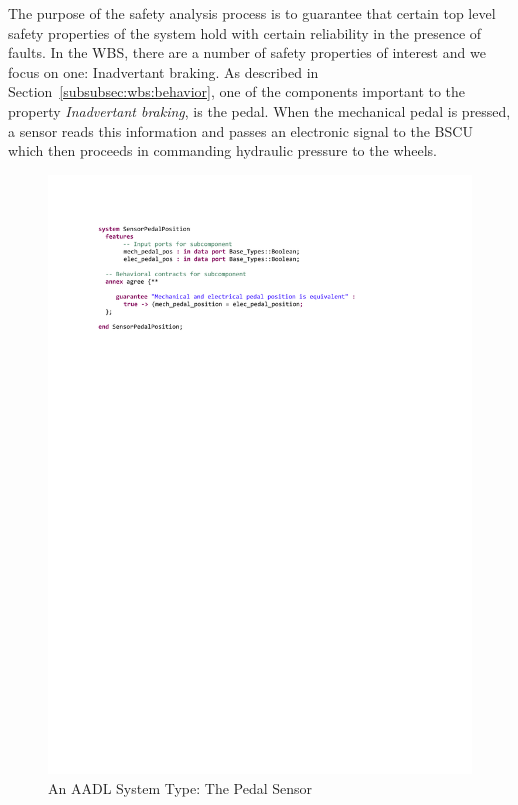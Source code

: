 The purpose of the safety analysis process is to guarantee that certain top level safety properties of the system hold with certain reliability in the presence of faults. In the WBS, there are a number of safety properties of interest and we focus on one: Inadvertant braking. As described in Section~\ref{subsubsec:wbs:behavior}, one of the components important to the property \textit{Inadvertant braking}, is the pedal. When the mechanical pedal is pressed, a sensor reads this information and passes an electronic signal to the BSCU which then proceeds in commanding hydraulic pressure to the wheels. 

\begin{figure}[h!]
	\hspace*{-2cm}
	\vspace{-0.4in} 
	\begin{center}
		\includegraphics[trim=0 640 -10 70,clip,width=1.5\dimexpr\textwidth-2cm\relax]{images/system_sensor.pdf}
		\caption{An AADL System Type: The Pedal Sensor}
		\label{fig:sensor}
	\end{center}
	\vspace{-0.3in}
\end{figure}

